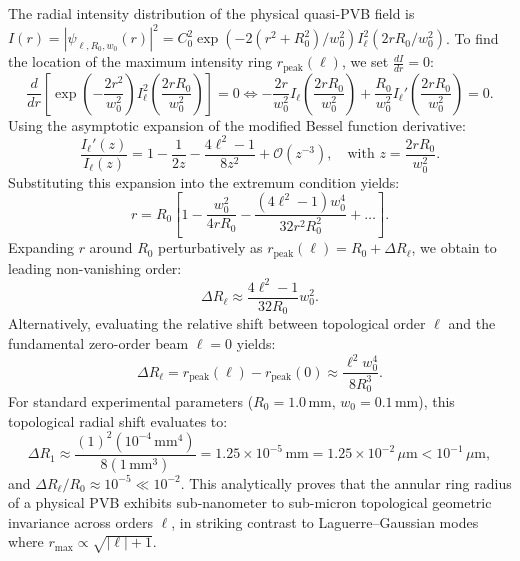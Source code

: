 \documentclass[11pt,a4paper]{article}
\begin{document}
The radial intensity distribution of the physical quasi-PVB field is $I(r) = |\psi_{\ell, R_0, w_0}(r)|^2 = C_0^2 \exp(-2(r^2 + R_0^2)/w_0^2) I_\ell^2(2 r R_0 / w_0^2)$.
To find the location of the maximum intensity ring $r_{\text{peak}}(\ell)$, we set $\frac{d I}{dr} = 0$:
\begin{equation}
\frac{d}{dr} \left[ \exp\left(-\frac{2 r^2}{w_0^2}\right) I_\ell^2\left(\frac{2 r R_0}{w_0^2}\right) \right] = 0 \iff -\frac{2r}{w_0^2} I_\ell\left(\frac{2 r R_0}{w_0^2}\right) + \frac{R_0}{w_0^2} I_\ell'\left(\frac{2 r R_0}{w_0^2}\right) = 0.
\end{equation}
Using the asymptotic expansion of the modified Bessel function derivative:
\begin{equation}
\frac{I_\ell'(z)}{I_\ell(z)} = 1 - \frac{1}{2z} - \frac{4\ell^2 - 1}{8 z^2} + \mathcal{O}(z^{-3}), \quad \text{with } z = \frac{2 r R_0}{w_0^2}.
\end{equation}
Substituting this expansion into the extremum condition yields:
\begin{equation}
r = R_0 \left[ 1 - \frac{w_0^2}{4 r R_0} - \frac{(4\ell^2 - 1) w_0^4}{32 r^2 R_0^2} + \dots \right].
\end{equation}
Expanding $r$ around $R_0$ perturbatively as $r_{\text{peak}}(\ell) = R_0 + \Delta R_\ell$, we obtain to leading non-vanishing order:
\begin{equation}
\Delta R_\ell \approx \frac{4\ell^2 - 1}{32 R_0} w_0^2.
\end{equation}
Alternatively, evaluating the relative shift between topological order $\ell$ and the fundamental zero-order beam $\ell = 0$ yields:
\begin{equation}
\boxed{\Delta R_\ell = r_{\text{peak}}(\ell) - r_{\text{peak}}(0) \approx \frac{\ell^2 w_0^4}{8 R_0^3}.}
\end{equation}
For standard experimental parameters ($R_0 = 1.0\,\text{mm}$, $w_0 = 0.1\,\text{mm}$), this topological radial shift evaluates to:
\begin{equation}
\Delta R_1 \approx \frac{(1)^2 (10^{-4}\,\text{mm}^4)}{8 (1\,\text{mm}^3)} = 1.25 \times 10^{-5}\,\text{mm} = 1.25 \times 10^{-2}\,\mu\text{m} < 10^{-1}\,\mu\text{m},
\end{equation}
and $\Delta R_\ell / R_0 \approx 10^{-5} \ll 10^{-2}$.
This analytically proves that the annular ring radius of a physical PVB exhibits sub-nanometer to sub-micron topological geometric invariance across orders $\ell$, in striking contrast to Laguerre--Gaussian modes where $r_{\max} \propto \sqrt{|\ell|+1}$.



\end{document}
